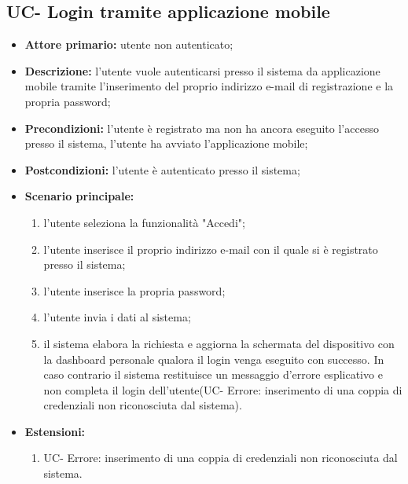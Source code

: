 
\subsection{UC- Login tramite applicazione mobile}
\begin{itemize}
	\item \textbf{Attore primario:} utente non autenticato;

	\item \textbf{Descrizione:} l'utente vuole autenticarsi presso il sistema da applicazione mobile tramite l'inserimento del proprio indirizzo e-mail di registrazione e la propria password;

	\item \textbf{Precondizioni:} l'utente è registrato ma non ha ancora eseguito l'accesso presso il sistema, l'utente ha avviato l'applicazione mobile;

	\item \textbf{Postcondizioni:} l'utente è autenticato presso il sistema;
	\item\textbf{Scenario principale:}
	      \begin{enumerate}
		      \item l'utente seleziona la funzionalità "Accedi";
		      \item l'utente inserisce il proprio indirizzo e-mail con il quale si è registrato presso il sistema;
		      \item l'utente inserisce la propria password;
		      \item l'utente invia i dati al sistema;
		      \item il sistema elabora la richiesta e aggiorna la schermata del dispositivo con la dashboard personale qualora il login venga eseguito con successo. In caso contrario il sistema restituisce un messaggio d'errore 			      esplicativo e non completa il login dell'utente(UC- Errore: inserimento di una coppia di credenziali non riconosciuta dal sistema).
	      \end{enumerate}
	\item \textbf{Estensioni:}
	      \begin{enumerate}
		      \item UC- Errore: inserimento di una coppia di credenziali non riconosciuta dal sistema.
	      \end{enumerate}
\end{itemize}

